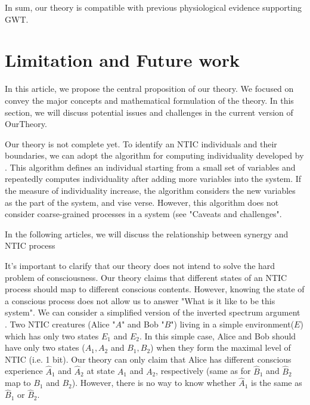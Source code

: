 \documentclass[utf8]{article}
\begin{document}
		In sum, our theory is compatible with previous physiological evidence supporting GWT.  





    \section{Limitation and Future work}\label{sec:Limitation and Future work}  
        In this article, we propose the central proposition of our theory. We focused on convey the major concepts and mathematical formulation of the theory. In this section, we will discuss potential issues and challenges in the current version of \ac{OurTheory}.
    
    
        Our theory is not complete yet. 
        To identify an NTIC individuals and their boundaries, we can adopt the algorithm for computing individuality developed by \cite{krakauer2014information}. This algorithm defines an individual starting from a small set of variables and repeatedly computes individuality after adding more variables into the system. If the measure of individuality increase, the algorithm considers the new variables as the part of the system, and vise verse. However, this algorithm does not consider coarse-grained processes in a system (see "Caveats and challenges"\cite[p. 13]{krakauer2014information}. 
        
        
        In the following articles, we will discuss the relationship between synergy and NTIC process
    

        It's important to clarify that our theory does not intend to solve the hard problem of consciousness\citep{chalmers1995facing}. Our theory claims that different states of an NTIC process should map to different conscious contents. However, knowing the state of a conscious process does not allow us to answer "What is it like to be this system"\citep{nagel1974like}. We can consider a simplified version of the inverted spectrum argument \citep{Shoemaker1982-SHOTIS, Block1990-BLOIE, Locke1979-LOCTCE-2}. Two NTIC creatures (Alice "$A$" and Bob "$B$") living in a simple environment($E$) which has only two states $E_1$ and $E_2$. In this simple case, Alice and Bob should have only two states ($A_1, A_2$ and $B_1, B_2$) when they form the maximal level of NTIC (i.e. 1 bit). Our theory can only claim that Alice has different conscious experience $\hat{A}_1$ and $\hat{A}_2$ at state $A_1$ and $A_2$, respectively (same as for $\hat{B}_1$ and $\hat{B}_2$ map to $B_1$ and $B_2$). However, there is no way to know whether $\hat{A}_1$ is the same as $\hat{B}_1$ or $\hat{B}_2$. 
        
\end{document}
